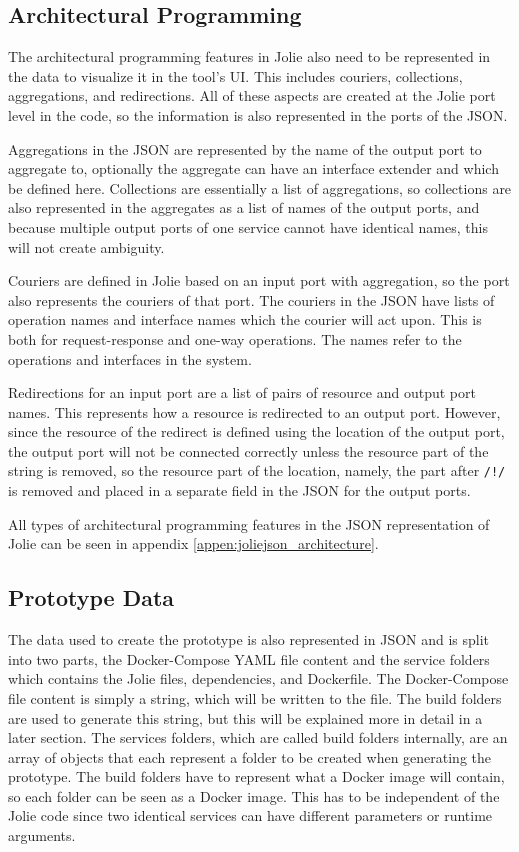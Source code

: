 \subsection{Architectural Programming}
The architectural programming features in Jolie also need to be represented in the data to visualize it in the tool's UI.
This includes couriers, collections, aggregations, and redirections. All of these aspects are created at the Jolie port level in the code, so the information is also represented in the ports of the JSON.

Aggregations in the JSON are represented by the name of the output port to aggregate to, optionally the aggregate can have an interface extender and which be defined here.
Collections are essentially a list of aggregations, so collections are also represented in the aggregates as a list of names of the output ports, and because multiple output ports of one service cannot have identical names, this will not create ambiguity.

Couriers are defined in Jolie based on an input port with aggregation, so the port also represents the couriers of that port.
The couriers in the JSON have lists of operation names and interface names which the courier will act upon. This is both for request-response and one-way operations. The names refer to the operations and interfaces in the system.

Redirections for an input port are a list of pairs of resource and output port names. This represents how a resource is redirected to an output port.
However, since the resource of the redirect is defined using the location of the output port, the output port will not be connected correctly unless the resource part of the string is removed, so the resource part of the location, namely,
the part after \texttt{/!/} is removed and placed in a separate field in the JSON for the output ports.

All types of architectural programming features in the JSON representation of Jolie can be seen in appendix \ref*{appen:joliejson_architecture}.

\subsection{Prototype Data}
The data used to create the prototype is also represented in JSON and is split into two parts, the Docker-Compose YAML file content and the service folders which contains the Jolie files, dependencies, and Dockerfile.
The Docker-Compose file content is simply a string, which will be written to the file. The build folders are used to generate this string, but this will be explained more in detail in a later section.
The services folders, which are called build folders internally, are an array of objects that each represent a folder to be created when generating the prototype.
The build folders have to represent what a Docker image will contain, so each folder can be seen as a Docker image. This has to be independent of the Jolie code since two identical services can have different parameters or runtime arguments.

